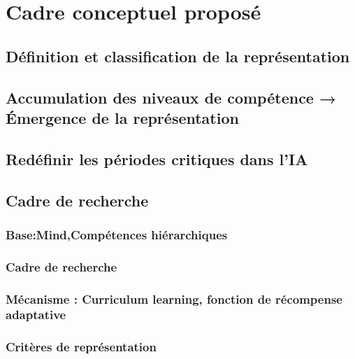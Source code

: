 \chapter{Cadre conceptuel proposé}

\section{Définition et classification de la représentation}

\section{Accumulation des niveaux de compétence → Émergence de la représentation}

\section{Redéfinir les périodes critiques dans l'IA }

\section{Cadre de recherche }

\subsection{Base:Mind,Compétences hiérarchiques }
\subsection{Cadre de recherche }
\subsection{Mécanisme : Curriculum learning, fonction de récompense adaptative }
\subsection{Critères de représentation}